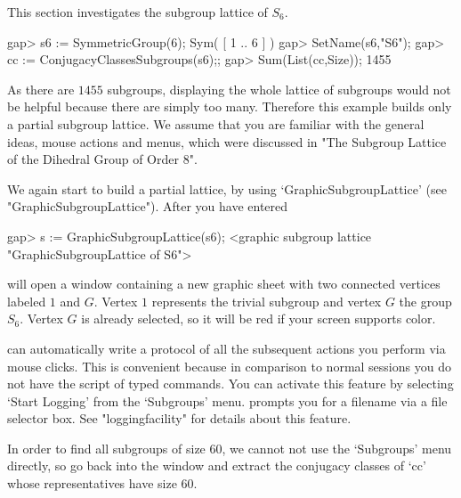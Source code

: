 

This section investigates the subgroup lattice of $S_6$.

\begintt
gap> s6 := SymmetricGroup(6);
Sym( [ 1 .. 6 ] )
gap> SetName(s6,"S6");
gap> cc := ConjugacyClassesSubgroups(s6);;
gap> Sum(List(cc,Size));
1455
\endtt

As there are $1455$ subgroups,  displaying  the whole lattice of  subgroups
would not  be helpful because  there are simply  too many.   Therefore this
example builds only a partial  subgroup lattice.   We  assume that you  are
familiar with  the  general ideas,  mouse   actions and  menus, which  were
discussed in "The Subgroup Lattice of the Dihedral Group of Order 8".

We again start to build a partial lattice, by using
`GraphicSubgroupLattice' (see "GraphicSubgroupLattice").  After you have
entered

\begintt
gap> s := GraphicSubgroupLattice(s6);
<graphic subgroup lattice "GraphicSubgroupLattice of S6">
\endtt

{\XGAP}  will open  a window  containing  a new  graphic  sheet with  two
connected vertices   labeled  $1$ and $G$.     Vertex  $1$ represents the
trivial subgroup and  vertex $G$ the group $S_6$.   Vertex $G$ is already
selected, so it will be red if your screen supports color.

{\XGAP} can automatically write a protocol of all the subsequent
actions you perform via mouse clicks. This is convenient because in
comparison to normal {\GAP} sessions you do not have the script of
typed commands. You can activate this feature by selecting `Start
Logging' from the `Subgroups' menu. {\XGAP} prompts you for a filename 
via a file selector box. See "loggingfacility" for details about this
feature. 

In order  to  find all subgroups   of size $60$, we  cannot   not use the
`Subgroups' menu directly, so go back into the  {\GAP} window and extract
the conjugacy classes of `cc' whose representatives have size $60$.

